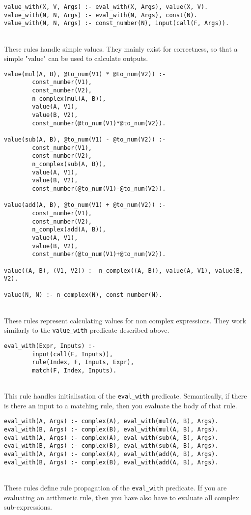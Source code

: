 \begin{lstlisting}
value_with(X, V, Args) :- eval_with(X, Args), value(X, V).
value_with(N, N, Args) :- eval_with(N, Args), const(N).
value_with(N, N, Args) :- const_number(N), input(call(F, Args)).
\end{lstlisting}
\mbox{} \\
These rules handle simple values. They mainly exist for correctness, so that a simple "value" can be used to calculate outputs. \\

\begin{lstlisting}
value(mul(A, B), @to_num(V1) * @to_num(V2)) :- 
		const_number(V1), 
		const_number(V2), 
		n_complex(mul(A, B)), 
		value(A, V1), 
		value(B, V2), 
		const_number(@to_num(V1)*@to_num(V2)).
		
value(sub(A, B), @to_num(V1) - @to_num(V2)) :- 
		const_number(V1), 
		const_number(V2), 
		n_complex(sub(A, B)), 
		value(A, V1), 
		value(B, V2), 
		const_number(@to_num(V1)-@to_num(V2)).
		
value(add(A, B), @to_num(V1) + @to_num(V2)) :- 
		const_number(V1), 
		const_number(V2), 
		n_complex(add(A, B)), 
		value(A, V1), 
		value(B, V2), 
		const_number(@to_num(V1)+@to_num(V2)).
		
value((A, B), (V1, V2)) :- n_complex((A, B)), value(A, V1), value(B, V2).

value(N, N) :- n_complex(N), const_number(N).
\end{lstlisting}
\mbox{} \\
These rules represent calculating values for non complex expressions. They work similarly to the \lstinline{value_with} predicate described above.\\ %

\begin{lstlisting}
eval_with(Expr, Inputs) :- 
		input(call(F, Inputs)), 
		rule(Index, F, Inputs, Expr), 
		match(F, Index, Inputs).
\end{lstlisting}
\mbox{} \\
This rule handles initialisation of the \lstinline{eval_with} predicate. Semantically, if there is there an input to a matching rule, then you evaluate the body of that rule. \\ %

\begin{lstlisting}
eval_with(A, Args) :- complex(A), eval_with(mul(A, B), Args).
eval_with(B, Args) :- complex(B), eval_with(mul(A, B), Args).
eval_with(A, Args) :- complex(A), eval_with(sub(A, B), Args).
eval_with(B, Args) :- complex(B), eval_with(sub(A, B), Args).
eval_with(A, Args) :- complex(A), eval_with(add(A, B), Args).
eval_with(B, Args) :- complex(B), eval_with(add(A, B), Args).
\end{lstlisting}
\mbox{} \\
These rules define rule propagation of the \lstinline{eval_with} predicate. If you are evaluating an arithmetic rule, then you have also have to evaluate all complex sub-expressions. \\ %

